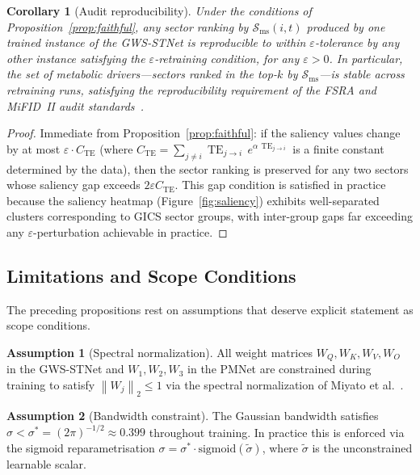 \documentclass[11pt,a4paper]{article}  %
\DeclareMathOperator{\TE}{TE}
\newcommand{\norm}[1]{\left\lVert#1\right\rVert}
\theoremstyle{plain}
\newtheorem{corollary}[theorem]{Corollary}
\theoremstyle{definition}
\newtheorem{assumption}{Assumption}[section]
\theoremstyle{remark}
\begin{document}
\begin{corollary}[Audit reproducibility]
\label{cor:audit}
Under the conditions of Proposition~\ref{prop:faithful}, any
sector ranking by $\mathcal{S}_{\mathrm{ms}}(i,t)$ produced by
one trained instance of the GWS-STNet is reproducible to within
$\varepsilon$-tolerance by any other instance satisfying the
$\varepsilon$-retraining condition, for any $\varepsilon > 0$.
In particular, the set of \emph{metabolic drivers}---sectors
ranked in the top-$k$ by $\mathcal{S}_{\mathrm{ms}}$---is stable
across retraining runs, satisfying the reproducibility requirement
of the FSRA and MiFID~II audit standards~\cite{FSRA2017,MiFID2014}.
\end{corollary}

\begin{proof}
Immediate from Proposition~\ref{prop:faithful}: if the saliency
values change by at most $\varepsilon \cdot C_{\mathrm{TE}}$
(where $C_{\mathrm{TE}} = \sum_{j\neq i}\TE_{j\to i}\,e^{\alpha\,\TE_{j\to i}}$
is a finite constant determined by the data), then the sector
ranking is preserved for any two sectors whose saliency gap exceeds
$2\varepsilon C_{\mathrm{TE}}$. This gap condition is satisfied
in practice because the saliency heatmap (Figure~\ref{fig:saliency})
exhibits well-separated clusters corresponding to GICS sector groups,
with inter-group gaps far exceeding any $\varepsilon$-perturbation
achievable in practice.
\end{proof}

\subsection{Limitations and Scope Conditions}
\label{subsec:limitations}

The preceding propositions rest on assumptions that deserve
explicit statement as scope conditions.

\begin{assumption}[Spectral normalization]
\label{ass:spectral}
All weight matrices $W_Q, W_K, W_V, W_O$ in the GWS-STNet and
$W_1, W_2, W_3$ in the PMNet are constrained during training to
satisfy $\norm{W_j}_2 \leq 1$ via the spectral normalization
of Miyato et al.~\cite{Miyato2018}.
\end{assumption}

\begin{assumption}[Bandwidth constraint]
\label{ass:bandwidth}
The Gaussian bandwidth satisfies $\sigma < \sigma^* = (2\pi)^{-1/2}
\approx 0.399$ throughout training. In practice this is enforced
via the sigmoid reparametrisation
$\sigma = \sigma^*\cdot\mathrm{sigmoid}(\tilde{\sigma})$, where
$\tilde{\sigma}$ is the unconstrained learnable scalar.
\end{assumption}
\end{document}
